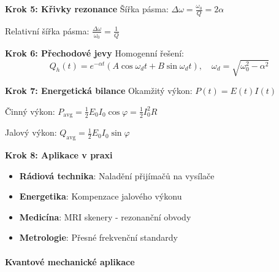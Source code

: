 \begin{example}
\vspace{1\baselineskip}

\noindent\textbf{Krok 5: Křivky rezonance}
Šířka pásma: $\Delta\omega = \frac{\omega_0}{Q} = 2\alpha$

Relativní šířka pásma: $\frac{\Delta\omega}{\omega_0} = \frac{1}{Q}$

\vspace{1\baselineskip}

\noindent\textbf{Krok 6: Přechodové jevy}
Homogenní řešení:
\[
Q_h(t) = e^{-\alpha t}(A\cos\omega_d t + B\sin\omega_d t), \quad \omega_d = \sqrt{\omega_0^2 - \alpha^2}
\]

\vspace{1\baselineskip}

\noindent\textbf{Krok 7: Energetická bilance}
Okamžitý výkon: $P(t) = E(t)I(t)$

Činný výkon: $P_{\text{avg}} = \frac{1}{2}E_0 I_0\cos\varphi = \frac{1}{2}I_0^2 R$

Jalový výkon: $Q_{\text{avg}} = \frac{1}{2}E_0 I_0\sin\varphi$

\vspace{1\baselineskip}

\noindent\textbf{Krok 8: Aplikace v praxi}
\begin{itemize}
\item \textbf{Rádiová technika}: Naladění přijímačů na vysílače
\item \textbf{Energetika}: Kompenzace jalového výkonu
\item \textbf{Medicína}: MRI skenery - rezonanční obvody
\item \textbf{Metrologie}: Přesné frekvenční standardy
\end{itemize}

\end{example}

\paragraph{Kvantové mechanické aplikace}

